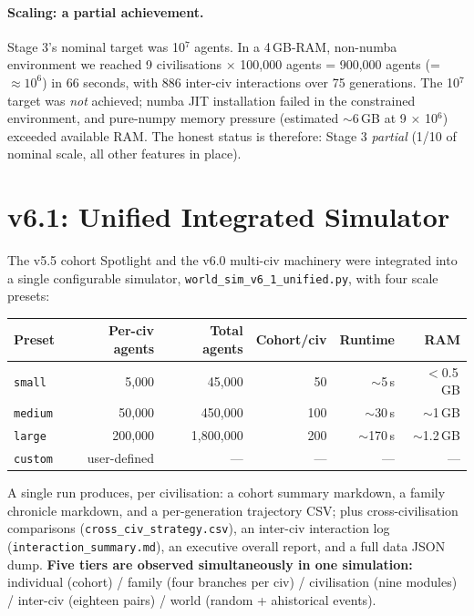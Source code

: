 \paragraph{Scaling: a partial achievement.}
Stage 3's nominal target was 10$^7$ agents. In a 4\,GB-RAM,
non-numba environment we reached 9 civilisations × 100{,}000 agents
= 900{,}000 agents (= $\approx 10^6$) in 66 seconds, with 886
inter-civ interactions over 75 generations. The 10$^7$ target was
\emph{not} achieved; numba JIT installation failed in the
constrained environment, and pure-numpy memory pressure (estimated
$\sim$6\,GB at 9 × 10$^6$) exceeded available RAM. The honest
status is therefore: Stage 3 \emph{partial} (1/10 of nominal scale,
all other features in place).

\section{v6.1: Unified Integrated Simulator}
\label{sec:v61-unified}

The v5.5 cohort Spotlight and the v6.0 multi-civ machinery were
integrated into a single configurable simulator,
\texttt{world\_sim\_v6\_1\_unified.py}, with four scale presets:

\begin{center}
\begin{tabular}{lrrrrr}
\toprule
Preset & Per-civ agents & Total agents & Cohort/civ & Runtime & RAM \\
\midrule
\texttt{small}  &   5{,}000 &   45{,}000 &  50 &   $\sim$5\,s   & $<$0.5\,GB \\
\texttt{medium} &  50{,}000 &  450{,}000 & 100 &   $\sim$30\,s  & $\sim$1\,GB \\
\texttt{large}  & 200{,}000 & 1{,}800{,}000 & 200 &  $\sim$170\,s & $\sim$1.2\,GB \\
\texttt{custom} & user-defined & --- & --- & --- & --- \\
\bottomrule
\end{tabular}
\end{center}

A single run produces, per civilisation: a cohort summary
markdown, a family chronicle markdown, and a per-generation
trajectory CSV; plus cross-civilisation comparisons
(\texttt{cross\_civ\_strategy.csv}), an inter-civ interaction
log (\texttt{interaction\_summary.md}), an executive overall report,
and a full data JSON dump. \textbf{Five tiers are observed
simultaneously in one simulation:} individual (cohort) / family
(four branches per civ) / civilisation (nine modules) / inter-civ
(eighteen pairs) / world (random + ahistorical events).

